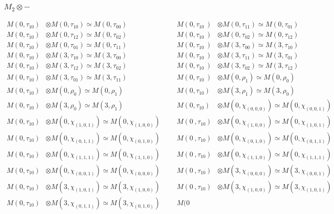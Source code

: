 \subsubsection{$M_2\otimes -$}
\begin{align*}
M(0,\tau_{10}) &\otimes M(0,\tau_{10}) \simeq M(0,\tau_{00}) &&& M(0,\tau_{10}\
) &\otimes M(0,\tau_{11}) \simeq M(0,\tau_{01})\\
M(0,\tau_{10}) &\otimes M(0,\tau_{12}) \simeq M(0,\tau_{02}) &&& M(0,\tau_{10}\
) &\otimes M(0,\tau_{02}) \simeq M(0,\tau_{12})\\
M(0,\tau_{10}) &\otimes M(0,\tau_{01}) \simeq M(0,\tau_{11}) &&& M(0,\tau_{10}\
) &\otimes M(3,\tau_{00}) \simeq M(3,\tau_{10})\\
M(0,\tau_{10}) &\otimes M(3,\tau_{10}) \simeq M(3,\tau_{00}) &&& M(0,\tau_{10}\
) &\otimes M(3,\tau_{11}) \simeq M(3,\tau_{01})\\
M(0,\tau_{10}) &\otimes M(3,\tau_{12}) \simeq M(3,\tau_{02}) &&& M(0,\tau_{10}\
) &\otimes M(3,\tau_{02}) \simeq M(3,\tau_{12})\\
M(0,\tau_{10}) &\otimes M(3,\tau_{01}) \simeq M(3,\tau_{11}) &&& M(0,\tau_{10}\
) &\otimes M(0,\rho_{1}) \simeq M(0,\rho_{0})\\
M(0,\tau_{10}) &\otimes M(0,\rho_{0}) \simeq M(0,\rho_{1}) &&& M(0,\tau_{10}) \
&\otimes M(3,\rho_{1}) \simeq M(3,\rho_{0})\\
M(0,\tau_{10}) &\otimes M(3,\rho_{0}) \simeq M(3,\rho_{1}) &&& M(0,\tau_{10}) \
&\otimes M(0,\chi_{(0,0,0)}) \simeq M(0,\chi_{(0,0,1)})\\
M(0,\tau_{10}) &\otimes M(0,\chi_{(1,0,1)}) \simeq M(0,\chi_{(1,0,0)}) &&& M(0\
,\tau_{10}) &\otimes M(0,\chi_{(1,0,0)}) \simeq M(0,\chi_{(1,0,1)})\\
M(0,\tau_{10}) &\otimes M(0,\chi_{(0,1,1)}) \simeq M(0,\chi_{(0,1,0)}) &&& M(0\
,\tau_{10}) &\otimes M(0,\chi_{(0,1,0)}) \simeq M(0,\chi_{(0,1,1)})\\
M(0,\tau_{10}) &\otimes M(0,\chi_{(1,1,1)}) \simeq M(0,\chi_{(1,1,0)}) &&& M(0\
,\tau_{10}) &\otimes M(0,\chi_{(1,1,0)}) \simeq M(0,\chi_{(1,1,1)})\\
M(0,\tau_{10}) &\otimes M(0,\chi_{(0,0,1)}) \simeq M(0,\chi_{(0,0,0)}) &&& M(0\
,\tau_{10}) &\otimes M(3,\chi_{(0,0,0)}) \simeq M(3,\chi_{(0,0,1)})\\
M(0,\tau_{10}) &\otimes M(3,\chi_{(1,0,1)}) \simeq M(3,\chi_{(1,0,0)}) &&& M(0\
,\tau_{10}) &\otimes M(3,\chi_{(1,0,0)}) \simeq M(3,\chi_{(1,0,1)})\\
M(0,\tau_{10}) &\otimes M(3,\chi_{(0,1,1)}) \simeq M(3,\chi_{(0,1,0)}) &&& M(0\

\end{align*}

